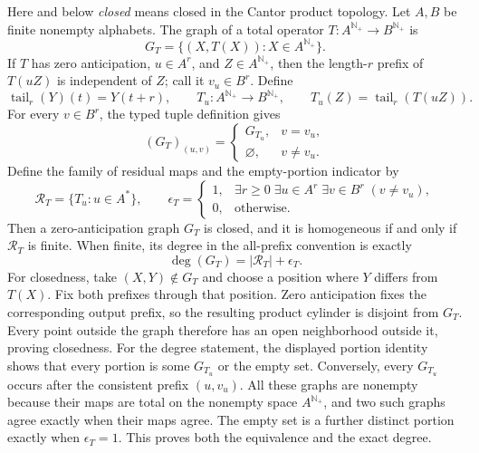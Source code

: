 Here and below \emph{closed} means closed in the Cantor product topology.
Let \(A,B\) be finite nonempty alphabets.  The graph of a total operator
\(T:A^{\mathbb N_{+}}\to B^{\mathbb N_{+}}\) is
\[
 G_T=\{(X,T(X)):X\in A^{\mathbb N_{+}}\}.
\]
If \(T\) has zero anticipation, \(u\in A^r\), and \(Z\in A^{\mathbb N_{+}}\),
then the length-\(r\) prefix of \(T(uZ)\) is independent of \(Z\); call it
\(v_u\in B^r\).  Define
\[
 \operatorname{tail}_r(Y)(t)=Y(t+r),
 \qquad
 T_u:A^{\mathbb N_{+}}\longrightarrow B^{\mathbb N_{+}},
 \qquad
 T_u(Z)=\operatorname{tail}_r(T(uZ)).
\]
For every \(v\in B^r\), the typed tuple definition gives
\[
 (G_T)_{(u,v)}
 =\begin{cases}
   G_{T_u},&v=v_u,\\
   \varnothing,&v\neq v_u.
  \end{cases}
\]
Define the family of residual maps and the empty-portion indicator by
\[
 \mathcal R_T=\{T_u:u\in A^*\},\qquad
 \epsilon_T=
 \begin{cases}
  1,&\exists r\geq0\;\exists u\in A^r\;\exists v\in B^r\;(v\ne v_u),\\
  0,&\text{otherwise}.
 \end{cases}
\]
Then a zero-anticipation graph \(G_T\) is closed, and it is homogeneous
if and only if \(\mathcal R_T\) is finite.  When finite, its degree in
the all-prefix convention is exactly
\[
 \deg(G_T)=|\mathcal R_T|+\epsilon_T.
\]
For closedness, take \((X,Y)\notin G_T\) and choose a position where
\(Y\) differs from \(T(X)\).  Fix both prefixes through that position.
Zero anticipation fixes the corresponding output prefix, so the resulting
product cylinder is disjoint from \(G_T\).  Every point outside the graph
therefore has an open neighborhood outside it, proving closedness.
For the degree statement, the displayed portion identity shows that every
portion is some \(G_{T_u}\) or the empty set.  Conversely, every
\(G_{T_u}\) occurs after the consistent prefix \((u,v_u)\).
All these graphs are nonempty because their maps are total on the nonempty
space \(A^{\mathbb N_+}\), and two such graphs agree exactly when their
maps agree.  The empty set is a further distinct portion exactly when
\(\epsilon_T=1\).  This proves both the equivalence and the exact degree.


